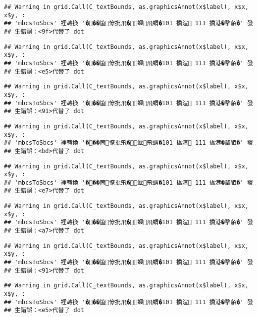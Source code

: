 \documentclass[
]{article}
\begin{document}
\begin{verbatim}
## Warning in grid.Call(C_textBounds, as.graphicsAnnot(x$label), x$x, x$y, :
## 'mbcsToSbcs' 裡轉換 '���箇憭批飛�蝘飛蝟�101 撟渲 111 撟港�摮貊�' 發
## 生錯誤：<9f>代替了 dot
\end{verbatim}

\begin{verbatim}
## Warning in grid.Call(C_textBounds, as.graphicsAnnot(x$label), x$x, x$y, :
## 'mbcsToSbcs' 裡轉換 '���箇憭批飛�蝘飛蝟�101 撟渲 111 撟港�摮貊�' 發
## 生錯誤：<e5>代替了 dot
\end{verbatim}

\begin{verbatim}
## Warning in grid.Call(C_textBounds, as.graphicsAnnot(x$label), x$x, x$y, :
## 'mbcsToSbcs' 裡轉換 '���箇憭批飛�蝘飛蝟�101 撟渲 111 撟港�摮貊�' 發
## 生錯誤：<91>代替了 dot
\end{verbatim}

\begin{verbatim}
## Warning in grid.Call(C_textBounds, as.graphicsAnnot(x$label), x$x, x$y, :
## 'mbcsToSbcs' 裡轉換 '���箇憭批飛�蝘飛蝟�101 撟渲 111 撟港�摮貊�' 發
## 生錯誤：<bd>代替了 dot
\end{verbatim}

\begin{verbatim}
## Warning in grid.Call(C_textBounds, as.graphicsAnnot(x$label), x$x, x$y, :
## 'mbcsToSbcs' 裡轉換 '���箇憭批飛�蝘飛蝟�101 撟渲 111 撟港�摮貊�' 發
## 生錯誤：<e7>代替了 dot
\end{verbatim}

\begin{verbatim}
## Warning in grid.Call(C_textBounds, as.graphicsAnnot(x$label), x$x, x$y, :
## 'mbcsToSbcs' 裡轉換 '���箇憭批飛�蝘飛蝟�101 撟渲 111 撟港�摮貊�' 發
## 生錯誤：<a7>代替了 dot
\end{verbatim}

\begin{verbatim}
## Warning in grid.Call(C_textBounds, as.graphicsAnnot(x$label), x$x, x$y, :
## 'mbcsToSbcs' 裡轉換 '���箇憭批飛�蝘飛蝟�101 撟渲 111 撟港�摮貊�' 發
## 生錯誤：<91>代替了 dot
\end{verbatim}

\begin{verbatim}
## Warning in grid.Call(C_textBounds, as.graphicsAnnot(x$label), x$x, x$y, :
## 'mbcsToSbcs' 裡轉換 '���箇憭批飛�蝘飛蝟�101 撟渲 111 撟港�摮貊�' 發
## 生錯誤：<e5>代替了 dot
\end{verbatim}
\end{document}
